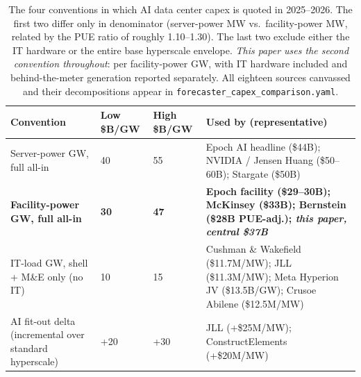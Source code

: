 \begin{table}[h]
\centering
\small
\begin{tabular}{@{}L{4.6cm}R{1.7cm}R{1.7cm}L{6.0cm}@{}}
\toprule
\textbf{Convention} & \textbf{Low \$B/GW} & \textbf{High \$B/GW} & \textbf{Used by (representative)} \\
\midrule
Server-power GW, full all-in & 40 & 55 & Epoch AI headline (\$44B); NVIDIA / Jensen Huang (\$50--60B); Stargate (\$50B) \\
\textbf{Facility-power GW, full all-in} & \textbf{30} & \textbf{47} & \textbf{Epoch facility (\$29--30B); McKinsey (\$33B); Bernstein (\$28B PUE-adj.); \emph{this paper, central \$37B}} \\
IT-load GW, shell + M\&E only (no IT) & 10 & 15 & Cushman \& Wakefield (\$11.7M/MW); JLL (\$11.3M/MW); Meta Hyperion JV (\$13.5B/GW); Crusoe Abilene (\$12.5M/MW) \\
AI fit-out delta (incremental over standard hyperscale) & +20 & +30 & JLL (+\$25M/MW); ConstructElements (+\$20M/MW) \\
\bottomrule
\end{tabular}
\caption{The four conventions in which AI data center capex is quoted in 2025--2026. The first two differ only in denominator (server-power MW vs.\ facility-power MW, related by the PUE ratio of roughly 1.10--1.30). The last two exclude either the IT hardware or the entire base hyperscale envelope. \emph{This paper uses the second convention throughout}: per facility-power GW, with IT hardware included and behind-the-meter generation reported separately. All eighteen sources canvassed and their decompositions appear in \texttt{forecaster\_capex\_comparison.yaml}.\protect\footnotemark}
\label{tab:basis-conventions}
\end{table}

